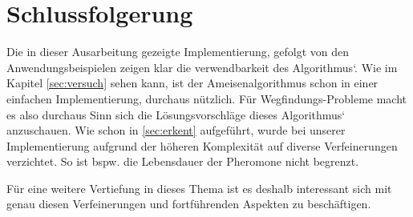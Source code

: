 
\section{Schlussfolgerung}
Die in dieser Ausarbeitung gezeigte Implementierung, gefolgt von den Anwendungsbeispielen zeigen klar die verwendbarkeit des Algorithmus`.
Wie im Kapitel \ref{sec:versuch} sehen kann, ist der Ameisenalgorithmus schon in einer einfachen Implementierung, durchaus nützlich.
Für Wegfindungs-Probleme macht es also durchaus Sinn sich die Lösungsvorschläge dieses Algorithmus` anzuschauen.
Wie schon in \ref{sec:erkent} aufgeführt, wurde bei unserer Implementierung aufgrund der höheren Komplexität auf diverse Verfeinerungen
verzichtet. So ist bspw. die Lebensdauer der Pheromone nicht begrenzt.\par 
Für eine weitere Vertiefung in dieses Thema ist es deshalb interessant sich mit genau diesen Verfeinerungen und fortführenden Aspekten zu beschäftigen.
